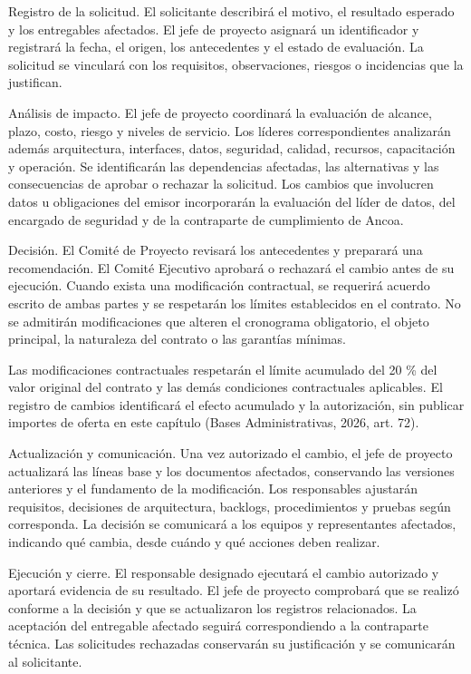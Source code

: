 \documentclass[11pt]{article}
\begin{document}
Registro de la solicitud. El solicitante describirá el motivo, el
resultado esperado y los entregables afectados. El jefe de proyecto
asignará un identificador y registrará la fecha, el origen, los
antecedentes y el estado de evaluación. La solicitud se vinculará con
los requisitos, observaciones, riesgos o incidencias que la justifican.

Análisis de impacto. El jefe de proyecto coordinará la evaluación de
alcance, plazo, costo, riesgo y niveles de servicio. Los líderes
correspondientes analizarán además arquitectura, interfaces, datos,
seguridad, calidad, recursos, capacitación y operación. Se identificarán
las dependencias afectadas, las alternativas y las consecuencias de
aprobar o rechazar la solicitud. Los cambios que involucren datos u
obligaciones del emisor incorporarán la evaluación del líder de datos,
del encargado de seguridad y de la contraparte de cumplimiento de Ancoa.

Decisión. El Comité de Proyecto revisará los antecedentes y preparará
una recomendación. El Comité Ejecutivo aprobará o rechazará el cambio
antes de su ejecución. Cuando exista una modificación contractual, se
requerirá acuerdo escrito de ambas partes y se respetarán los límites
establecidos en el contrato. No se admitirán modificaciones que alteren
el cronograma obligatorio, el objeto principal, la naturaleza del
contrato o las garantías mínimas.

Las modificaciones contractuales respetarán el límite acumulado del 20
\% del valor original del contrato y las demás condiciones contractuales
aplicables. El registro de cambios identificará el efecto acumulado y la
autorización, sin publicar importes de oferta en este capítulo (Bases
Administrativas, 2026, art. 72).

Actualización y comunicación. Una vez autorizado el cambio, el jefe de
proyecto actualizará las líneas base y los documentos afectados,
conservando las versiones anteriores y el fundamento de la modificación.
Los responsables ajustarán requisitos, decisiones de arquitectura,
backlogs, procedimientos y pruebas según corresponda. La decisión se
comunicará a los equipos y representantes afectados, indicando qué
cambia, desde cuándo y qué acciones deben realizar.

Ejecución y cierre. El responsable designado ejecutará el cambio
autorizado y aportará evidencia de su resultado. El jefe de proyecto
comprobará que se realizó conforme a la decisión y que se actualizaron
los registros relacionados. La aceptación del entregable afectado
seguirá correspondiendo a la contraparte técnica. Las solicitudes
rechazadas conservarán su justificación y se comunicarán al solicitante.
\end{document}
